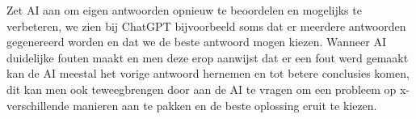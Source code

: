 
Zet AI aan om eigen antwoorden opnieuw te beoordelen en mogelijks te verbeteren, we zien bij ChatGPT bijvoorbeeld soms dat er meerdere antwoorden gegenereerd worden en dat we de beste antwoord mogen kiezen. Wanneer AI duidelijke fouten maakt en men deze erop aanwijst dat er een fout werd gemaakt kan de AI meestal het vorige antwoord hernemen en tot betere conclusies komen, dit kan men ook teweegbrengen door aan de AI te vragen om een probleem op x-verschillende manieren aan te pakken en de beste oplossing eruit te kiezen.


